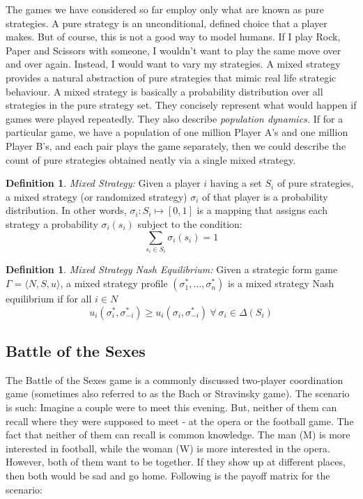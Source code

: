 \documentclass{article}
\theoremstyle{definition}
\newtheorem{defn}[theorem]{Definition}
\begin{document}
The games we have considered so far employ only what are known as pure strategies. A pure strategy is an unconditional, defined choice that a player makes. But of course, this is not a good way to model humans. If I play Rock, Paper and Scissors with someone, I wouldn't want to play the same move over and over again. Instead, I would want to vary my strategies. A mixed strategy provides a natural abstraction of pure strategies that mimic real life strategic behaviour. A mixed strategy is basically a probability distribution over all strategies in the pure strategy set. They concisely represent what would happen if games were played repeatedly. They also describe \textit{population dynamics.} If for a particular game, we have a population of one million Player A's and one million Player B's, and each pair plays the game separately, then we could describe the count of pure strategies obtained neatly via a single mixed strategy.

\begin{defn}
    \textit{Mixed Strategy:} Given a player $i$ having a set $S_i$ of pure strategies, a mixed strategy (or randomized strategy) $\sigma_i$ of that player is a probability distribution. In other words, $\sigma_i : S_i \mapsto [0,1]$ is a mapping that assigns each strategy a probability $\sigma_i(s_i)$ subject to the condition:
    \[
        \sum_{s_i \in S_i} \sigma_i(s_i) = 1
    \]
\end{defn}

\begin{defn}
    \textit{Mixed Strategy Nash Equilibrium:} Given a strategic form game $\Gamma = \langle N, S, u \rangle$, a mixed strategy profile $(\sigma^{*}_1, \ldots , \sigma^{*}_n)$ is a mixed strategy Nash equilibrium if for all $i \in N$
    \[
        u_i(\sigma^{*}_i , \sigma^{*}_{-i}) \geq u_i(\sigma_i, \sigma^{*}_{-i}) \: \forall \: \sigma_i \in \Delta(S_i)
    \]
\end{defn}

\subsection{Battle of the Sexes}

The Battle of the Sexes game is a commonly discussed two-player coordination game (sometimes also referred to as the Bach or Stravinsky game). The scenario is such: Imagine a couple were to meet this evening. But, neither of them can recall where they were supposed to meet - at the opera or the football game. The fact that neither of them can recall is common knowledge. The man (M) is more interested in football, while the woman (W) is more interested in the opera. However, both of them want to be together. If they show up at different places, then both would be sad and go home. Following is the payoff matrix for the scenario: \medskip
\end{document}
